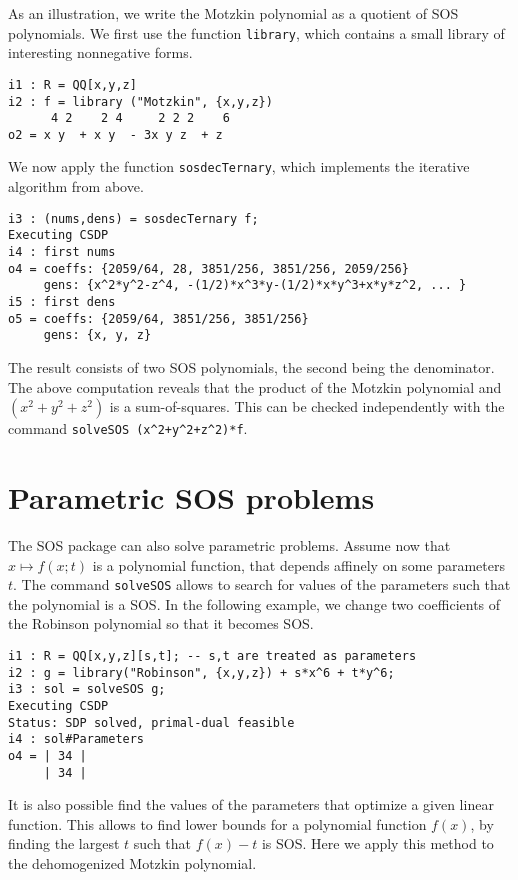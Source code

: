\documentclass[11pt]{amsart}
\theoremstyle{plain}%
\theoremstyle{definition}
\theoremstyle{remark}
\newcommand{\SOS}{\textsc{SOS}\xspace}
\begin{document}
As an illustration, we write the Motzkin polynomial as a quotient of SOS polynomials.
We first use the function \verb|library|, which contains a small library of interesting nonnegative forms.
{\small
\begin{verbatim}
i1 : R = QQ[x,y,z]
i2 : f = library ("Motzkin", {x,y,z})
      4 2    2 4     2 2 2    6
o2 = x y  + x y  - 3x y z  + z
\end{verbatim}
}
\noindent
We now apply the function \verb|sosdecTernary|, which implements the iterative algorithm from above.
{\small
\begin{verbatim}
i3 : (nums,dens) = sosdecTernary f;
Executing CSDP
i4 : first nums
o4 = coeffs: {2059/64, 28, 3851/256, 3851/256, 2059/256}
     gens: {x^2*y^2-z^4, -(1/2)*x^3*y-(1/2)*x*y^3+x*y*z^2, ... }
i5 : first dens
o5 = coeffs: {2059/64, 3851/256, 3851/256}
     gens: {x, y, z}
\end{verbatim}
}
\noindent
The result consists of two SOS polynomials, the second being the denominator.
The above computation reveals that the product of the Motzkin polynomial and $(x^2{+}y^2{+}z^2)$ is a sum-of-squares.
This can be checked independently with the command \verb|solveSOS (x^2+y^2+z^2)*f|.

\section{Parametric SOS problems}

The \SOS package can also solve parametric problems.
Assume now that $x \mapsto f(x;t)$ is a polynomial function, that depends affinely on some parameters~$t$.
The command \verb|solveSOS| allows to search for values of the parameters such that the polynomial is a SOS.
In the following example, we change two coefficients of the Robinson polynomial so that it becomes SOS.
{\small
\begin{verbatim}
i1 : R = QQ[x,y,z][s,t]; -- s,t are treated as parameters
i2 : g = library("Robinson", {x,y,z}) + s*x^6 + t*y^6;
i3 : sol = solveSOS g;
Executing CSDP
Status: SDP solved, primal-dual feasible
i4 : sol#Parameters
o4 = | 34 |
     | 34 |
\end{verbatim}
}

It is also possible find the values of the parameters that optimize a given linear function.
This allows to find lower bounds for a polynomial function $f(x)$,
by finding the largest $t$ such that $f(x)-t$ is SOS.
Here we apply this method to the dehomogenized Motzkin polynomial.
\end{document}
